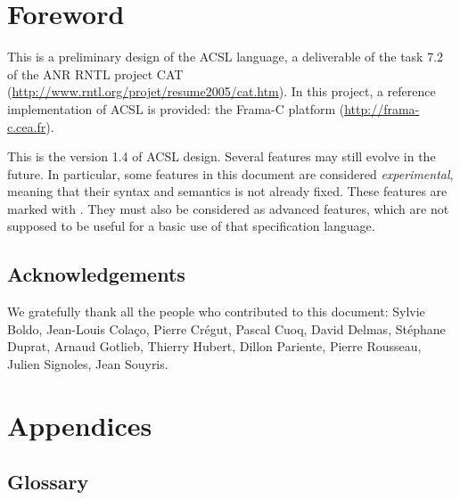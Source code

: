\documentclass[a4paper,11pt,twoside,openright]{report}
\newcommand{\version}{1.4}
\begin{document}
\chapter*{Foreword}

This is a preliminary design of the ACSL language, a deliverable of
the task 7.2 of the ANR RNTL project CAT
(\url{http://www.rntl.org/projet/resume2005/cat.htm}). In this
project, a reference implementation of ACSL is provided: the Frama-C
platform (\url{http://frama-c.cea.fr}).

This is the version \version{} of ACSL design. Several features may still
evolve in the future. In particular, some features in this document
are considered \emph{experimental}, meaning that their syntax and
semantics is not already fixed.  These features are marked with
\experimental.  They must also be considered as advanced features,
which are not supposed to be useful for a basic use of that
specification language.

\section*{Acknowledgements}

We gratefully thank all the people who contributed to this document:
Sylvie Boldo,
Jean-Louis Cola\c{c}o,
Pierre Cr\'egut,
Pascal Cuoq,
David Delmas,
St\'ephane Duprat,
Arnaud Gotlieb,
Thierry Hubert,
Dillon Pariente,
Pierre Rousseau,
Julien Signoles,
Jean Souyris.









\appendix

\chapter{Appendices}
\label{chap:appendix}



\section{Glossary}
\label{sec:glossary}
\end{document}
